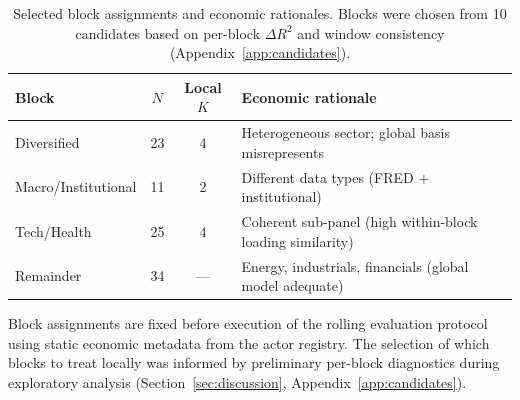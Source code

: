 \documentclass[11pt,a4paper]{article}
\begin{document}
\begin{table}[H]
\centering
\caption{Selected block assignments and economic rationales. Blocks were chosen from 10 candidates based on per-block $\Delta R^2$ and window consistency (Appendix~\ref{app:candidates}).}
\label{tab:blocks}
\small
\begin{tabular}{lccl}
\toprule
Block & $N$ & Local $K$ & Economic rationale \\
\midrule
Diversified & 23 & 4 & Heterogeneous sector; global basis misrepresents \\
Macro/Institutional & 11 & 2 & Different data types (FRED + institutional) \\
Tech/Health & 25 & 4 & Coherent sub-panel (high within-block loading similarity) \\
Remainder & 34 & --- & Energy, industrials, financials (global model adequate) \\
\bottomrule
\end{tabular}
\end{table}

Block assignments are fixed before execution of the rolling evaluation protocol using static economic metadata from the actor registry. The selection of which blocks to treat locally was informed by preliminary per-block diagnostics during exploratory analysis (Section~\ref{sec:discussion}, Appendix~\ref{app:candidates}).
\end{document}

